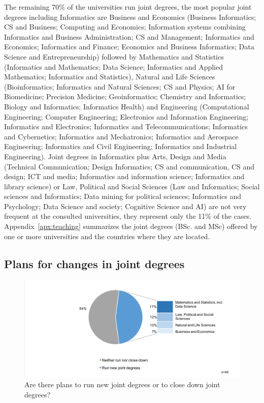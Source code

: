 The remaining 70\% of the universities run joint degrees, the most popular joint degrees including Informatics are  Business and Economics (Business Informatics; CS and Business; Computing and Economics; Information systems combining Informatics and Business Administration; CS and Management; Informatics and Economics; Informatics and Finance; Economics and Business Informatics; Data Science and Entrepreneurship) followed by Mathematics and Statistics (Informatics and Mathematics; Data Science; Informatics and Applied Mathematics; Informatics and Statistics), Natural and Life Sciences (Bioinformatics; Informatics and Natural Sciences; CS and Physics; AI for Biomedicine; Precision Medicine; Geoinformatics; Chemistry and Informatics; Biology and Informatics; Informatics Health) and Engineering (Computational Engineering; Computer Engineering; Electronics and Information Engineering; Informatics and Electronics; Informatics and Telecommunications; Informatics and Cybernetics; Informatics and Mechatronics; Informatics and Aerospace Engineering; Informatics and Civil Engineering; Informatics and Industrial Engineering). Joint degrees in Informatics plus Arts, Design and Media (Technical Communication; Design Informatics; CS and communication, CS and design; ICT and media; Informatics and information science; Informatics and library science) or Law, Political and Social Sciences (Law and Informatics; Social sciences and Informatics; Data mining for political sciences; Informatics and Psychology; Data Science and society; Cognitive Science and AI) are not very frequent at the consulted universities, they represent only the 11\% of the cases. Appendix~\ref{apx:teaching} summarizes  the joint degrees (BSc. and MSc) offered by one or more universities and the countries where they are located.

\subsection{Plans for changes in joint degrees} 

\begin{figure}[h]
\includegraphics[width = \linewidth]{charts/2b.png}
\caption{Are there plans to run new joint degrees or to close down joint degrees?}
\label{sect3:change}
\end{figure}

